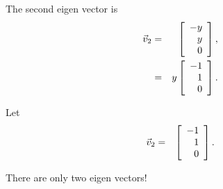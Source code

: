 \begin{frame}

  The second eigen vector is 
  \begin{eqnarray*}
    \vec{v}_2 & = & \left[ \begin{array}{r} -y \\ y \\ 0 \end{array} \right], \\
    & = & y \left[ \begin{array}{r} -1 \\ 1 \\ 0 \end{array} \right].
  \end{eqnarray*}

  Let
  \begin{eqnarray*}
    \vec{v}_2 & = & \left[ \begin{array}{r} -1 \\ 1 \\ 0 \end{array} \right].
  \end{eqnarray*}

  There are only two eigen vectors!

\end{frame}




